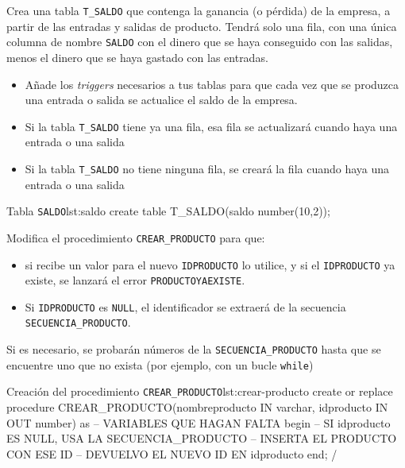\newpage

\begin{homeworkProblem}

  Crea una tabla \texttt{T\_SALDO} que contenga la ganancia (o pérdida) de la empresa, a partir de las entradas y salidas de producto. Tendrá solo una fila, con una única columna de nombre \texttt{SALDO} con el dinero que se haya conseguido con las salidas, menos el dinero que se haya gastado con las entradas.
  
  \begin{itemize}
  \item Añade los \textit{triggers} necesarios a tus tablas para que cada vez que se produzca una entrada o salida se actualice el saldo de la empresa.
  \item Si la tabla \texttt{T\_SALDO} tiene ya una fila, esa fila se actualizará cuando haya una entrada o una salida
  \item Si la tabla \texttt{T\_SALDO} no tiene ninguna fila, se creará la fila cuando haya una entrada o una salida
  \end{itemize}

  
\begin{listadosql}{Tabla \texttt{SALDO}}{lst:saldo}
create table T_SALDO(saldo number(10,2));
\end{listadosql}

\end{homeworkProblem}


\begin{homeworkProblem}

  Modifica el procedimiento \texttt{CREAR\_PRODUCTO} para que:
  \begin{itemize}
  \item   si recibe un valor para el nuevo \texttt{IDPRODUCTO} lo utilice,  y si el \texttt{IDPRODUCTO} ya existe, se lanzará el error \texttt{PRODUCTOYAEXISTE}.
  \item   Si \texttt{IDPRODUCTO} es \texttt{NULL}, el identificador se extraerá de la secuencia \texttt{SECUENCIA\_PRODUCTO}.  
  \end{itemize}

  


  \begin{Aviso}
    Si es necesario, se probarán números de la \texttt{SECUENCIA\_PRODUCTO} hasta que se encuentre uno que no exista (por ejemplo, con un bucle \texttt{while})
  \end{Aviso}


\begin{listadosql}{Creación del procedimiento \texttt{CREAR\_PRODUCTO}}{lst:crear-producto}
create or replace procedure CREAR_PRODUCTO(nombreproducto IN varchar, idproducto IN OUT number)
as 
  -- VARIABLES QUE HAGAN FALTA
begin
  -- SI idproducto ES NULL, USA LA SECUENCIA_PRODUCTO
  -- INSERTA EL PRODUCTO CON ESE ID
  -- DEVUELVO EL NUEVO ID EN idproducto
end;
/
\end{listadosql}

  
\end{homeworkProblem}


